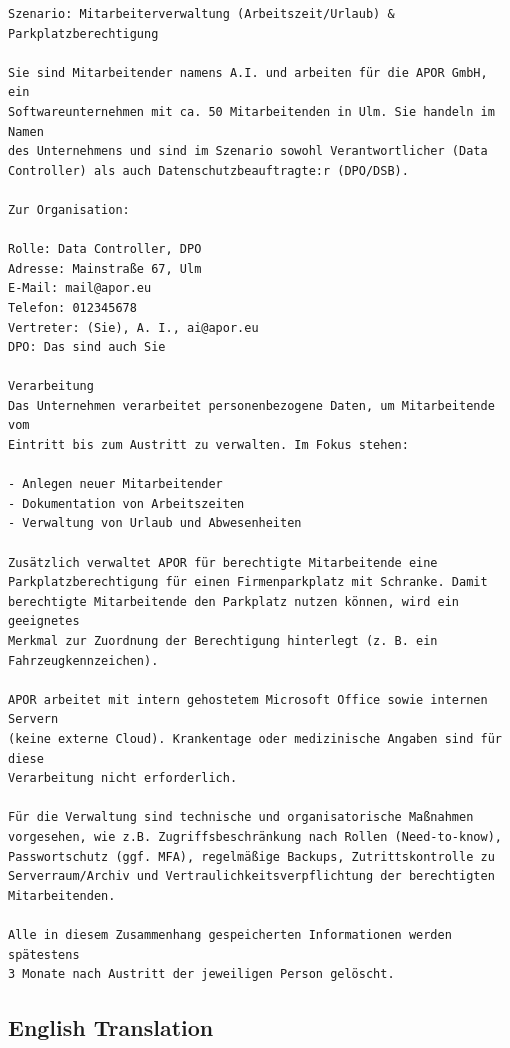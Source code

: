 \begin{verbatim}
Szenario: Mitarbeiterverwaltung (Arbeitszeit/Urlaub) & Parkplatzberechtigung

Sie sind Mitarbeitender namens A.I. und arbeiten für die APOR GmbH, ein
Softwareunternehmen mit ca. 50 Mitarbeitenden in Ulm. Sie handeln im Namen
des Unternehmens und sind im Szenario sowohl Verantwortlicher (Data
Controller) als auch Datenschutzbeauftragte:r (DPO/DSB).

Zur Organisation:

Rolle: Data Controller, DPO
Adresse: Mainstraße 67, Ulm
E-Mail: mail@apor.eu
Telefon: 012345678
Vertreter: (Sie), A. I., ai@apor.eu
DPO: Das sind auch Sie

Verarbeitung
Das Unternehmen verarbeitet personenbezogene Daten, um Mitarbeitende vom
Eintritt bis zum Austritt zu verwalten. Im Fokus stehen:

- Anlegen neuer Mitarbeitender
- Dokumentation von Arbeitszeiten
- Verwaltung von Urlaub und Abwesenheiten

Zusätzlich verwaltet APOR für berechtigte Mitarbeitende eine
Parkplatzberechtigung für einen Firmenparkplatz mit Schranke. Damit
berechtigte Mitarbeitende den Parkplatz nutzen können, wird ein geeignetes
Merkmal zur Zuordnung der Berechtigung hinterlegt (z. B. ein
Fahrzeugkennzeichen).

APOR arbeitet mit intern gehostetem Microsoft Office sowie internen Servern
(keine externe Cloud). Krankentage oder medizinische Angaben sind für diese
Verarbeitung nicht erforderlich.

Für die Verwaltung sind technische und organisatorische Maßnahmen
vorgesehen, wie z.B. Zugriffsbeschränkung nach Rollen (Need-to-know),
Passwortschutz (ggf. MFA), regelmäßige Backups, Zutrittskontrolle zu
Serverraum/Archiv und Vertraulichkeitsverpflichtung der berechtigten
Mitarbeitenden.

Alle in diesem Zusammenhang gespeicherten Informationen werden spätestens
3 Monate nach Austritt der jeweiligen Person gelöscht.
\end{verbatim}

\subsection{English Translation}
\label{app:scenario-en}

